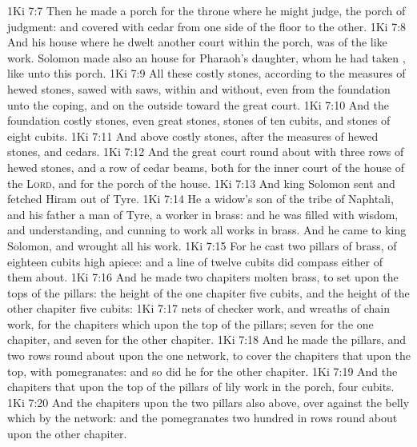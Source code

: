 \vs 1Ki 7:7 Then he made a porch for the throne where he might judge,  the porch of judgment: and  covered with cedar from one side of the floor to the other.
\vs 1Ki 7:8 And his house where he dwelt  another court within the porch,  was of the like work. Solomon made also an house for Pharaoh's daughter, whom he had taken , like unto this porch.
\vs 1Ki 7:9 All these  costly stones, according to the measures of hewed stones, sawed with saws, within and without, even from the foundation unto the coping, and  on the outside toward the great court.
\vs 1Ki 7:10 And the foundation  costly stones, even great stones, stones of ten cubits, and stones of eight cubits.
\vs 1Ki 7:11 And above  costly stones, after the measures of hewed stones, and cedars.
\vs 1Ki 7:12 And the great court round about  with three rows of hewed stones, and a row of cedar beams, both for the inner court of the house of the \textsc{Lord}, and for the porch of the house.
\vs 1Ki 7:13 And king Solomon sent and fetched Hiram out of Tyre.
\vs 1Ki 7:14 He  a widow's son of the tribe of Naphtali, and his father  a man of Tyre, a worker in brass: and he was filled with wisdom, and understanding, and cunning to work all works in brass. And he came to king Solomon, and wrought all his work.
\vs 1Ki 7:15 For he cast two pillars of brass, of eighteen cubits high apiece: and a line of twelve cubits did compass either of them about.
\vs 1Ki 7:16 And he made two chapiters  molten brass, to set upon the tops of the pillars: the height of the one chapiter  five cubits, and the height of the other chapiter  five cubits:
\vs 1Ki 7:17  nets of checker work, and wreaths of chain work, for the chapiters which  upon the top of the pillars; seven for the one chapiter, and seven for the other chapiter.
\vs 1Ki 7:18 And he made the pillars, and two rows round about upon the one network, to cover the chapiters that  upon the top, with pomegranates: and so did he for the other chapiter.
\vs 1Ki 7:19 And the chapiters that  upon the top of the pillars  of lily work in the porch, four cubits.
\vs 1Ki 7:20 And the chapiters upon the two pillars  also above, over against the belly which  by the network: and the pomegranates  two hundred in rows round about upon the other chapiter.
